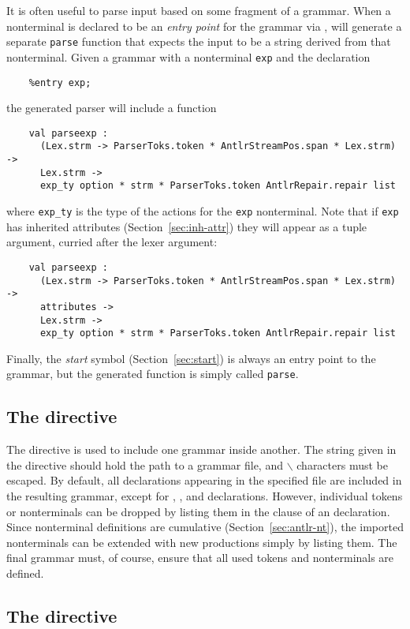 It is often useful to parse input based on some fragment of a grammar.  When a nonterminal is declared to be an \emph{entry point} for the grammar via , \antlr{} will generate a separate {\tt parse} function that expects the input to be a string derived from that nonterminal.  Given a grammar with a nonterminal {\tt exp} and the declaration
\begin{verbatim}
    %entry exp;
\end{verbatim}
the generated parser will include a function
\begin{verbatim}
    val parseexp :
      (Lex.strm -> ParserToks.token * AntlrStreamPos.span * Lex.strm) -> 
      Lex.strm -> 
      exp_ty option * strm * ParserToks.token AntlrRepair.repair list
\end{verbatim}
where {\tt exp\_ty} is the type of the actions for the {\tt exp} nonterminal.  Note that if {\tt exp} has inherited attributes (Section~\ref{sec:inh-attr}) they will appear as a tuple argument, curried after the lexer argument:
\begin{verbatim}
    val parseexp :
      (Lex.strm -> ParserToks.token * AntlrStreamPos.span * Lex.strm) -> 
      attributes ->
      Lex.strm -> 
      exp_ty option * strm * ParserToks.token AntlrRepair.repair list
\end{verbatim}
Finally, the \emph{start} symbol (Section~\ref{sec:start}) is always an entry point to the grammar, but the generated function is simply called {\tt parse}.

\subsection{The  directive}

The  directive is used to include one grammar inside another.  The string given in the directive should hold the path to a grammar file, and $\backslash$ characters must be escaped.  By default, all declarations appearing in the specified file are included in the resulting grammar, except for , , and  declarations.  However, individual tokens or nonterminals can be dropped by listing them in the  clause of an  declaration.  Since nonterminal definitions are cumulative (Section~\ref{sec:antlr-nt}), the imported nonterminals can be extended with new productions simply by listing them.
The final grammar must, of course, ensure that all used tokens and nonterminals are defined.

\subsection{The  directive}

